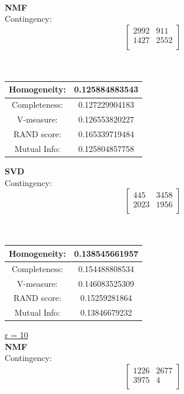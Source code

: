 \documentclass{report}
\begin{document}
 \\
\textbf{NMF} \\
Contingency: \[ 
\begin{bmatrix}
2992  		& 911 \\
1427	    & 2552 \\
\end{bmatrix}
\]
\\ \\

\begin{center}
\begin{tabu}{| c | c |}
\hline
Homogeneity: 		& 0.125884883543 \\
\hline
Completeness: 		& 0.127229904183 \\
\hline
V-measure: 			& 0.126553820227 \\
\hline
RAND score: 		& 0.165339719484 \\
\hline
Mutual Info: 		& 0.125804857758 \\
\hline
\end{tabu}
\end{center}

\textbf{SVD}\\

Contingency: \[
\begin{bmatrix}
445 		& 3458 \\
2023 		& 1956 \\
\end{bmatrix}
\]
\\ \\

\begin{center}
\begin{tabu}{| c | c |}
\hline
Homogeneity: 		& 0.138545661957 \\
\hline
Completeness: 		& 0.154488808534 \\
\hline
V-measure: 			& 0.146083525309 \\
\hline
RAND score: 		& 0.15259281864 \\
\hline
Mutual Info: 		& 0.13846679232 \\
\hline
\end{tabu}
\end{center}


\underline{r = 10} \\
\textbf{NMF} \\
Contingency: \[
\begin{bmatrix}
1226 		& 2677 \\
3975	    & 4 \\
\end{bmatrix}
\]
\\ \\
\end{document}
